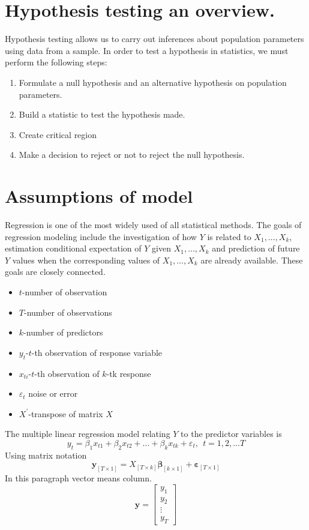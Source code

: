 \documentclass{book}
\begin{document}
\section{Hypothesis testing an overview.}
Hypothesis testing allows us to carry out inferences about population parameters using data from a sample. In order to test a hypothesis in statistics, we must perform the following steps:
\begin{enumerate}
\item Formulate a null hypothesis and an alternative hypothesis on population
parameters. 
\item Build a statistic to test the hypothesis made.
\item Create critical region
\item Make a decision to reject or not to reject the null hypothesis. 
\end{enumerate} 
\section{Assumptions of model}
Regression is one of the most widely used of all statistical methods. The goals of regression modeling include the investigation of how $Y$ is related to $X_{1},\dots,X_{k}$, estimation conditional expectation of $Y$ given $X_{1},\dots,X_{k}$ and prediction of future $Y$ values when the corresponding values of $X_{1},\dots,X_{k}$ are already available. These goals are closely connected.
\begin{itemize}
\item $t$-number of observation
\item $T$-number of observations
\item $k$-number of predictors
\item $y_{t}$-$t$-th observation of response variable
\item $x_{ti}$-$t$-th observation of $k$-tk response
\item $\varepsilon_{t}$ noise or error
\item $X^{'}$-transpose of matrix $X$
\end{itemize}
The multiple linear regression model relating $Y$ to the predictor variables is
\begin{equation}
\nonumber
y_{t}=\beta_{1}x_{t1}+\beta_{2}x_{t2}+\dots+\beta_{k}x_{tk}+\varepsilon_{t},\ \ t=1,2,\dots T
\end{equation}
Using matrix notation
\begin{equation}
\label{Geralt}
\mathbf{y}_{[T\times 1]}=X_{[T\times k]}\pmb{\beta}_{[k\times 1]}+\pmb{\varepsilon}_{[T\times 1]}
\end{equation}
In this paragraph vector means column.
\begin{equation}
\nonumber
\mathbf{y}=\left[\begin{array}{c}
y_{1}\\
y_{2}\\
\vdots\\
y_{T}
\end{array}\right]
\end{equation}
\end{document}
